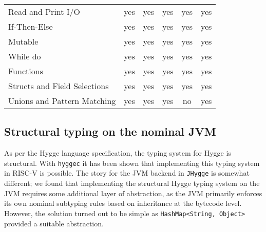 \begin{table}[H]
\begin{tabular}{lccccc}
Read and Print I/O           & yes                                & yes                              & yes                                & yes                                & yes                                                              \\
If-Then-Else                 & yes                                & yes                              & yes                                & yes                                & yes                                                              \\
Mutable                      & yes                                & yes                              & yes                                & yes                                & yes                                                              \\
While do                     & yes                                & yes                              & yes                                & yes                                & yes                                                              \\
Functions                    & yes                                & yes                              & yes                                & yes                                & yes                                                              \\ \cline{6-6} 
Structs and Field Selections & yes                                & yes                              & yes                                & \multicolumn{1}{c|}{yes}           & \multicolumn{1}{c|}{yes}                                         \\ \cline{6-6} 
Unions and Pattern Matching  & yes                                & yes                              & yes                                & no                                 & yes                                                             
\end{tabular}
\end{table}

\subsection{Structural typing on the nominal JVM}

As per the Hygge language specification, the typing system for Hygge is structural. With \texttt{hyggec} it has been shown
that implementing this typing system in RISC-V is possible. The story for the JVM backend in \texttt{JHygge} is somewhat different;
we found that implementing the structural Hygge typing system on the JVM requires some additional layer of abstraction, as
the JVM primarily enforces its own nominal subtyping rules based on inheritance at the bytecode level.
However, the solution turned out to be simple as \texttt{HashMap<String, Object>} provided a suitable abstraction.

